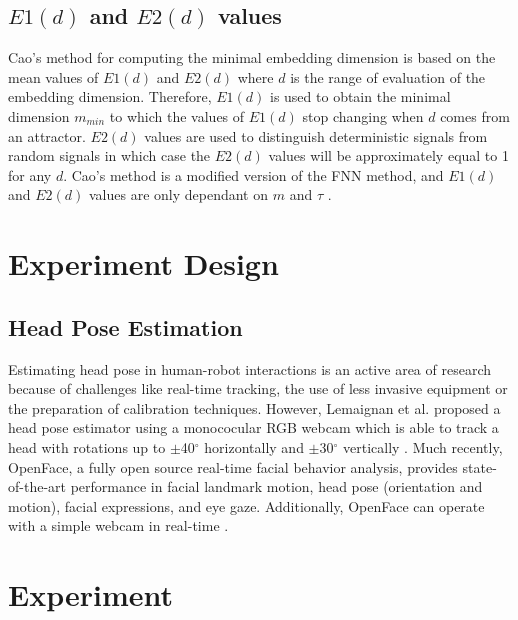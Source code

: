 \documentclass{sigchi}
\begin{document}
\subsection{$E1(d)$ and $E2(d)$ values}
Cao's method for computing the minimal embedding dimension is based on the
mean values of $E1(d)$ and $E2(d)$ where $d$ is the range of evaluation of the
embedding dimension. Therefore, $E1(d)$ is used to obtain the minimal
dimension $m_{min}$ to which the values of $E1(d)$ stop changing when
 $d$ comes from an attractor. $E2(d)$ values are used to distinguish
 deterministic signals from random signals in which case the $E2(d)$
 values will be approximately equal to 1 for any $d$.
Cao's method is a modified version of the FNN method, and $E1(d)$ and $E2(d)$
values are only dependant on $m$ and $\tau$ \cite{Cao1997}.


\section{Experiment Design}

\subsection{Head Pose Estimation}

Estimating head pose in human-robot interactions is an active area of research
because of challenges like real-time tracking, the use of less invasive equipment
or the preparation of calibration techniques. However, Lemaignan et al. proposed a head pose estimator
using a monococular RGB webcam which is able to track a head with rotations up
to $\pm$40$^{\circ}$ horizontally and $\pm$30$^{\circ}$ vertically \cite{Lemaignan2016}.
Much recently, OpenFace, a fully open source real-time facial behavior analysis,
provides state-of-the-art performance in facial landmark motion,
head pose (orientation and motion), facial expressions, and eye gaze.
Additionally, OpenFace can operate with a simple webcam in real-time
\cite{Baltrusaitis2016}.



\section{Experiment}
\end{document}
